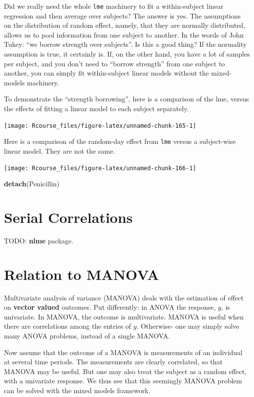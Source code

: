 \documentclass[]{book}
\newenvironment{Shaded}{\begin{snugshade}}{\end{snugshade}}
\newcommand{\KeywordTok}[1]{\textcolor[rgb]{0.13,0.29,0.53}{\textbf{#1}}}
\newcommand{\NormalTok}[1]{#1}
\theoremstyle{definition}
\theoremstyle{definition}
\theoremstyle{definition}
\theoremstyle{remark}
\begin{document}
Did we really need the whole \texttt{lme} machinery to fit a
within-subject linear regression and then average over subjects? The
answer is yes. The assumptions on the distribution of random effect,
namely, that they are normally distributed, allows us to pool
information from one subject to another. In the words of John Tukey:
``we borrow strength over subjects''. Is this a good thing? If the
normality assumption is true, it certainly is. If, on the other hand,
you have a lot of samples per subject, and you don't need to ``borrow
strength'' from one subject to another, you can simply fit
within-subject linear models without the mixed-models machinery.

To demonstrate the ``strength borrowing'', here is a comparison of the
lme, versus the effects of fitting a linear model to each subject
separately.

\texttt{[image: Rcourse\_files/figure-latex/unnamed-chunk-165-1]}

Here is a comparison of the random-day effect from \texttt{lme} versus a
subject-wise linear model. They are not the same.

\texttt{[image: Rcourse\_files/figure-latex/unnamed-chunk-166-1]}

\begin{Shaded}
\begin{Highlighting}[]
\KeywordTok{detach}\NormalTok{(Penicillin)}
\end{Highlighting}
\end{Shaded}

\section{Serial Correlations}\label{serial-correlations}

TODO: \textbf{nlme} package.

\section{Relation to MANOVA}\label{manova}

Multivariate analysis of variance (MANOVA) deals with the estimation of
effect on \textbf{vector valued} outcomes. Put differently: in ANOVA the
response, \(y\), is univariate. In MANOVA, the outcome is multivariate.
MANOVA is useful when there are correlations among the entries of \(y\).
Otherwise- one may simply solve many ANOVA problems, instead of a single
MANOVA.

Now assume that the outcome of a MANOVA is measurements of an individual
at several time periods. The measurements are clearly correlated, so
that MANOVA may be useful. But one may also treat the subject as a
random effect, with a univariate response. We thus see that this
seemingly MANOVA problem can be solved with the mixed models framework.
\end{document}
